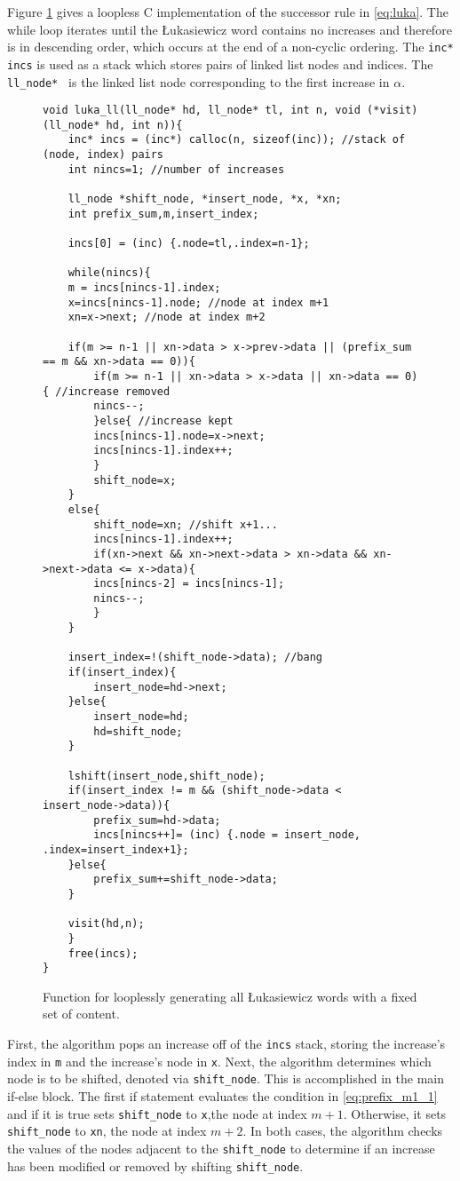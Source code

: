 Figure \ref{fig:lukaCode} gives a loopless C implementation of the successor rule in \eqref{eq:luka}.  The while loop iterates until the Łukasiewicz word contains no increases and therefore is in descending order, which occurs at the end of a non-cyclic ordering.  The \verb$inc* incs$ is used as a stack which stores pairs of linked list nodes and indices.  The \verb$ll_node* $ is the linked list node corresponding to the first increase in $\alpha$.  

\begin{figure}
\begin{Verbatim}
void luka_ll(ll_node* hd, ll_node* tl, int n, void (*visit)(ll_node* hd, int n)){
    inc* incs = (inc*) calloc(n, sizeof(inc)); //stack of (node, index) pairs
    int nincs=1; //number of increases

    ll_node *shift_node, *insert_node, *x, *xn;
    int prefix_sum,m,insert_index;

    incs[0] = (inc) {.node=tl,.index=n-1};

    while(nincs){
	m = incs[nincs-1].index;
	x=incs[nincs-1].node; //node at index m+1
	xn=x->next; //node at index m+2

	if(m >= n-1 || xn->data > x->prev->data || (prefix_sum == m && xn->data == 0)){
	    if(m >= n-1 || xn->data > x->data || xn->data == 0){ //increase removed
		nincs--;
	    }else{ //increase kept
		incs[nincs-1].node=x->next;
		incs[nincs-1].index++;
	    }
	    shift_node=x;
	}
	else{ 
	    shift_node=xn; //shift x+1...
	    incs[nincs-1].index++;
	    if(xn->next && xn->next->data > xn->data && xn->next->data <= x->data){
		incs[nincs-2] = incs[nincs-1];
		nincs--;
	    }
	}

	insert_index=!(shift_node->data); //bang
	if(insert_index){
	    insert_node=hd->next;
	}else{
	    insert_node=hd;
	    hd=shift_node;
	}

	lshift(insert_node,shift_node);
	if(insert_index != m && (shift_node->data < insert_node->data)){
	    prefix_sum=hd->data;
	    incs[nincs++]= (inc) {.node = insert_node, .index=insert_index+1};
	}else{
	    prefix_sum+=shift_node->data;
	}

	visit(hd,n);
    }
    free(incs);
}
\end{Verbatim}

\caption{Function for looplessly generating all Łukasiewicz words with a fixed set of content.}
\label{fig:lukaCode}
\end{figure}

First, the algorithm pops an increase off of the \verb$incs$ stack, storing the increase's index in \verb$m$ and the increase's node in \verb$x$.  Next, the algorithm determines which node is to be shifted, denoted via \verb$shift_node$.  This is accomplished in the main if-else block.  The first if statement evaluates the condition in \eqref{eq:prefix_m1_1} and if it is true sets \verb$shift_node$ to \verb$x$,the node at index $m+1$. Otherwise, it sets \verb$shift_node$ to \verb$xn$, the node at index $m+2$.  In both cases, the algorithm checks the values of the nodes adjacent to the \verb$shift_node$ to determine if an increase has been modified or removed by shifting \verb$shift_node$.


